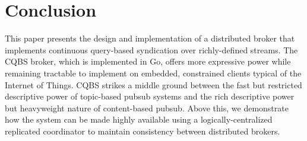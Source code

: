 \section{Conclusion}

This paper presents the design and implementation of a distributed broker that implements continuous query-based syndication over richly-defined streams.
The CQBS broker, which is implemented in Go, offers more expressive power while remaining tractable to implement on embedded, constrained clients typical of the Internet of Things.
CQBS strikes a middle ground between the fast but restricted descriptive power of topic-based pubsub systems and the rich descriptive power but heavyweight nature of content-based pubsub.
Above this, we demonstrate how the system can be made highly available using a logically-centralized replicated coordinator to maintain consistency between distributed brokers.

